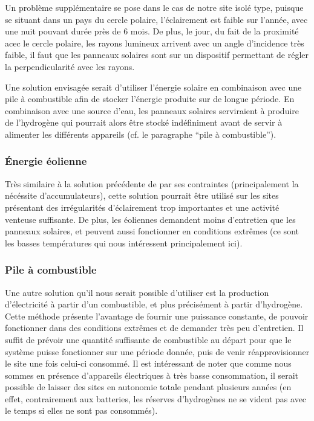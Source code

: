 Un problème supplémentaire se pose dans le cas de notre site isolé type, puisque se situant dans un pays du cercle polaire, l’éclairement est faible sur l'année, avec une nuit pouvant durée près de 6 mois. De plus, le jour, du fait de la proximité acec le cercle polaire, les rayons lumineux arrivent avec un angle d'incidence très faible, il faut que les panneaux solaires sont sur un dispositif permettant de régler la perpendicularité avec les rayons.

Une solution envisagée serait d’utiliser l’énergie solaire en combinaison avec une pile à combustible afin de stocker l’énergie produite sur de longue période. En combinaison avec une source d’eau, les panneaux solaires serviraient à produire de l’hydrogène qui pourrait alors être stocké indéfiniment avant de servir à alimenter les différents appareils (cf. le paragraphe “pile à combustible”).

\subsubsection{Énergie éolienne}

Très similaire à la solution précédente de par ses contraintes (principalement la nécéssite d’accumulateurs), cette solution pourrait être utilisé sur les sites présentant des irrégularités d’éclairement trop importantes et une activité venteuse suffisante. De plus, les éoliennes demandent moins d’entretien que les panneaux solaires, et peuvent aussi fonctionner en conditions extrêmes (ce sont les basses températures qui nous intéressent principalement ici).

\subsubsection{Pile à combustible}

Une autre solution qu’il nous serait possible d’utiliser est la production d’électricité à partir d’un combustible, et plus précisément à partir d’hydrogène. Cette méthode présente l’avantage de fournir une puissance constante, de pouvoir fonctionner dans des conditions extrêmes et de demander très peu d’entretien. Il suffit de prévoir une quantité suffisante de combustible au départ pour que le système puisse fonctionner sur une période donnée, puis de venir réapprovisionner le site une fois celui-ci consommé. Il est intéressant de noter que comme nous sommes en présence d’appareils électriques à très basse consommation, il serait possible de laisser des sites en autonomie totale pendant plusieurs années (en effet, contrairement aux batteries, les réserves d’hydrogènes ne se vident pas avec le temps si elles ne sont pas consommés).

